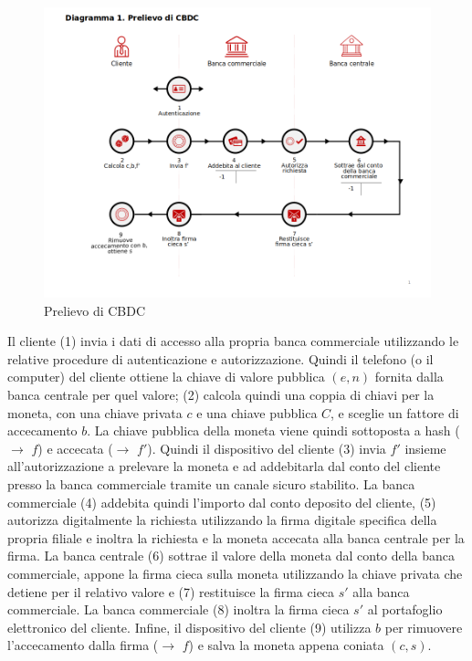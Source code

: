 \documentclass{article}
\begin{document}
\begin{figure}[h!]
  \includegraphics[width=\textwidth]{diagramma1-it.png}
  \caption{Prelievo di CBDC}
  \label{fig:fig1}
\end{figure}

Il cliente (1) invia i dati di accesso alla propria banca commerciale 
utilizzando le relative procedure di autenticazione e autorizzazione. 
Quindi il telefono (o il computer) del cliente ottiene la chiave di 
valore pubblica $(e, n)$ fornita dalla banca centrale per quel valore; (2) 
calcola quindi una coppia di chiavi per la moneta, con una chiave 
privata $c$ e una chiave pubblica $C$, e sceglie un fattore di accecamento 
$b$. La chiave pubblica della moneta viene quindi sottoposta a hash 
($\to$ $f$) e accecata ($\to$ $f'$). Quindi il dispositivo del cliente (3) 
invia $f'$ insieme all'autorizzazione a prelevare la moneta e ad 
addebitarla dal conto del cliente presso la banca commerciale tramite un 
canale sicuro stabilito. La banca commerciale (4) addebita quindi  
l'importo dal conto deposito del cliente, (5) autorizza digitalmente la 
richiesta utilizzando la firma digitale specifica della propria filiale 
e inoltra la richiesta e la moneta accecata alla banca centrale per la 
firma. La banca centrale (6) sottrae il valore della moneta dal conto 
della banca commerciale, appone la firma cieca sulla moneta 
utilizzando la chiave privata che detiene per il relativo valore e (7) 
restituisce la firma cieca $s'$ alla banca commerciale. La banca 
commerciale (8) inoltra la firma cieca $s'$ al portafoglio elettronico 
del cliente. Infine, il dispositivo del cliente (9) utilizza $b$ per 
rimuovere l'accecamento dalla firma ($\to$ $f$) e salva la moneta appena 
coniata $(c, s)$.
\end{document}
